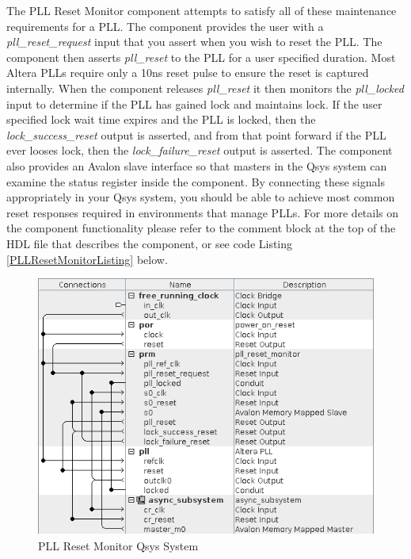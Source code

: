 \documentclass{article}
\begin{document}
\begin{flushleft}
\newline
\newline
The PLL Reset Monitor component attempts to satisfy all of these maintenance requirements for a PLL. The component provides the user with a \emph{pll\_reset\_request} input that you assert when you wish to reset the PLL.  The component then asserts \emph{pll\_reset} to the PLL for a user specified duration.  Most Altera PLLs require only a 10ns reset pulse to ensure the reset is captured internally. When the component releases \emph{pll\_reset} it then monitors the \emph{pll\_locked} input to determine if the PLL has gained lock and maintains lock.  If the user specified lock wait time expires and the PLL is locked, then the \emph{lock\_success\_reset} output is asserted, and from that point forward if the PLL ever looses lock, then the \emph{lock\_failure\_reset} output is asserted.  The component also provides an Avalon slave interface so that masters in the Qsys system can examine the status register inside the component.  By connecting these signals appropriately in your Qsys system, you should be able to achieve most common reset responses required in environments that manage PLLs.  For more details on the component functionality please refer to the comment block at the top of the HDL file that describes the component, or see code Listing \ref{PLLResetMonitorListing} below.

\begin{figure}[H]
\centering
\includegraphics[scale=0.675]{prm_qsys}
\caption{PLL Reset Monitor Qsys System}
\label{fig:prm_qsys}
\end{figure}


\end{flushleft}
\end{document}
